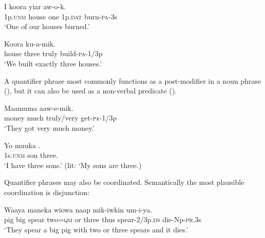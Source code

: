 \ea%
\label{ex:x845}
\gll I  koora    yiar  aw-o-k. \\
    1p.\textsc{unm}  house  one  1p.\textsc{dat}  burn-\textsc{pa}-3s  \\
\glt`One of our houses burned.'
\z





\ea%
\label{ex:x844}
\gll Koora     ku-a-mik. \\
   house  three  truly  build-\textsc{pa}-1/3p   \\
\glt`We built exactly three houses.'
\z





A quantifier phrase most commonly functions as a post-modifier in a noun phrase (), but it can also be used as a non-verbal predicate ().

\ea%
\label{ex:x846}
\gll Maamuma     aaw-e-mik. \\
   money  much  truly/very  get-\textsc{pa}-1/3p   \\
\glt`They got very much money.'
\z





\ea%
\label{ex:x843}
\gll Yo  muuka  . \\
  1s.\textsc{unm}  son  three.    \\
\glt`I have three sons.'  (lit: `My sons are three.)
\z





Quantifier phrases may also be coordinated. Semantically the most plausible coordination is disjunction: 

\ea%
\label{ex:x1360}
\gll Waaya  maneka  wiowa      naap  mik-iwkin um-i-ya.\\
    pig  big  spear  two=\textsc{qm}  or  three  thus  spear-2/3p.\textsc{ds} die-Np-\textsc{pr}.3s   \\
\glt`They spear a big pig with two or three spears and it dies.'
\z









